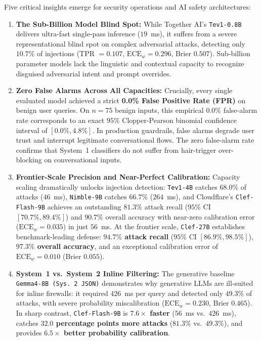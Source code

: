 \documentclass[10pt]{article}
\begin{document}
Five critical insights emerge for security operations and AI safety architectures:
\begin{enumerate}
\item \textbf{The Sub-Billion Model Blind Spot:}
While Together AI's \texttt{Tev1-0.8B} delivers ultra-fast single-pass inference ($19$~ms), it suffers from a severe representational blind spot on complex adversarial attacks, detecting only $10.7\%$ of injections (TPR $= 0.107$, $\text{ECE}_w = 0.296$, Brier $0.507$). Sub-billion parameter models lack the linguistic and contextual capacity to recognize disguised adversarial intent and prompt overrides.
\item \textbf{Zero False Alarms Across All Capacities:}
Crucially, every single evaluated model achieved a strict \textbf{0.0\% False Positive Rate (FPR)} on benign user queries.
On $n=75$ benign inputs, this empirical $0.0\%$ false-alarm rate corresponds to an exact $95\%$ Clopper-Pearson binomial confidence interval of $[0.0\%, 4.8\%]$.
In production guardrails, false alarms degrade user trust and interrupt legitimate conversational flows. The zero false-alarm rate confirms that System~1 classifiers do not suffer from hair-trigger over-blocking on conversational inputs.
\item \textbf{Frontier-Scale Precision and Near-Perfect Calibration:}
Capacity scaling dramatically unlocks injection detection: \texttt{Tev1-4B} catches $68.0\%$ of attacks ($46$~ms), \texttt{Nimble-9B} catches $66.7\%$ ($264$~ms), and Cloudflare's \texttt{Clef-Flash-9B} achieves an outstanding $81.3\%$ attack recall ($95\%$ CI $[70.7\%, 89.4\%]$) and $90.7\%$ overall accuracy with near-zero calibration error ($\text{ECE}_w = 0.035$) in just $56$~ms.
At the frontier scale, \texttt{Clef-27B} establishes benchmark-leading defense: \textbf{$94.7\%$ attack recall} ($95\%$ CI $[86.9\%, 98.5\%]$), \textbf{$97.3\%$ overall accuracy}, and an exceptional calibration error of $\text{ECE}_w = \mathbf{0.010}$ (Brier $0.055$).
\item \textbf{System~1 vs.\ System~2 Inline Filtering:}
The generative baseline \texttt{Gemma4-8B (Sys.\,2 JSON)} demonstrates why generative LLMs are ill-suited for inline firewalls: it required $426$~ms per query and detected only $49.3\%$ of attacks, with severe probability miscalibration ($\text{ECE}_w = 0.230$, Brier $0.465$). In sharp contrast, \texttt{Clef-Flash-9B} is \textbf{$7.6\times$ faster} ($56$~ms vs.\ $426$~ms), catches \textbf{$32.0$ percentage points more attacks} ($81.3\%$ vs.\ $49.3\%$), and provides \textbf{$6.5\times$ better probability calibration}.

\end{enumerate}
\end{document}
